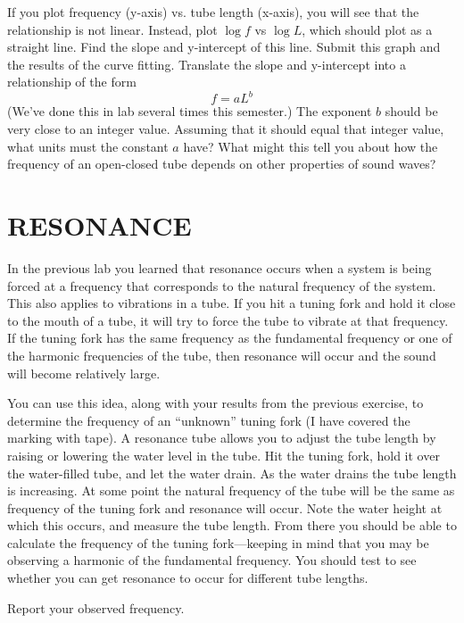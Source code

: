 \documentclass[11pt,letterpaper]{article}
\begin{document}
If you plot frequency (y-axis) vs. tube length (x-axis), you will see that the relationship is not linear. Instead, plot $\log f$ vs $\log L$, which should plot as a straight line. Find the slope and y-intercept of this line. Submit this graph and the results of the curve fitting. Translate the slope and y-intercept into a relationship of the form
$$f = aL^b$$
(We've done this in lab several times this semester.) The exponent $b$ should be very close to an integer value. Assuming that it should equal that integer value, what units must the constant $a$ have? What might this tell you about how the frequency of an open-closed tube depends on other properties of sound waves?



\section{RESONANCE}
In the previous lab you learned that resonance occurs when a system is being forced at a frequency that corresponds to the natural frequency of the system. This also applies to vibrations in a tube. If you hit a tuning fork and hold it close to the mouth of a tube, it will try to force the tube to vibrate at that frequency. If the tuning fork has the same frequency as the fundamental frequency or one of the harmonic frequencies of the tube, then resonance will occur and the sound will become relatively large.

You can use this idea, along with your results from the previous exercise, to determine the frequency of an ``unknown'' tuning fork (I have covered the marking with tape). A resonance tube allows you to adjust the tube length by raising or lowering the water level in the tube. Hit the tuning fork, hold it over the water-filled tube, and let the water drain. As the water drains the tube length is increasing. At some point the natural frequency of the tube will be the same as frequency of the tuning fork and resonance will occur. Note the water height at which this occurs, and measure the tube length. From there you should be able to calculate the frequency of the tuning fork---keeping in mind that you may be observing a harmonic of the fundamental frequency. You should test to see whether you can get resonance to occur for different tube lengths.

Report your observed frequency.
\end{document}

